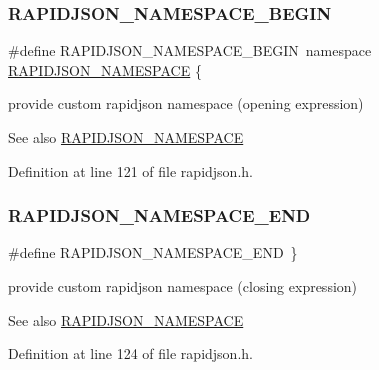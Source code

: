 \subsubsection{\texorpdfstring{RAPIDJSON\_NAMESPACE\_BEGIN}{RAPIDJSON\_NAMESPACE\_BEGIN}}
{\footnotesize\ttfamily \#define R\+A\+P\+I\+D\+J\+S\+O\+N\+\_\+\+N\+A\+M\+E\+S\+P\+A\+C\+E\+\_\+\+B\+E\+G\+IN~namespace \mbox{\hyperlink{group___r_a_p_i_d_j_s_o_n___c_o_n_f_i_g_ga743a79d3af927391fe3eb5c979136899}{R\+A\+P\+I\+D\+J\+S\+O\+N\+\_\+\+N\+A\+M\+E\+S\+P\+A\+CE}} \{}



provide custom rapidjson namespace (opening expression) 

\begin{DoxySeeAlso}{See also}
\mbox{\hyperlink{group___r_a_p_i_d_j_s_o_n___c_o_n_f_i_g_ga743a79d3af927391fe3eb5c979136899}{R\+A\+P\+I\+D\+J\+S\+O\+N\+\_\+\+N\+A\+M\+E\+S\+P\+A\+CE}} 
\end{DoxySeeAlso}


Definition at line 121 of file rapidjson.\+h.

\mbox{\label{group___r_a_p_i_d_j_s_o_n___c_o_n_f_i_g_gaf18f052a98b9f5df5448d39484b743c1}} 
\subsubsection{\texorpdfstring{RAPIDJSON\_NAMESPACE\_END}{RAPIDJSON\_NAMESPACE\_END}}
{\footnotesize\ttfamily \#define R\+A\+P\+I\+D\+J\+S\+O\+N\+\_\+\+N\+A\+M\+E\+S\+P\+A\+C\+E\+\_\+\+E\+ND~\}}



provide custom rapidjson namespace (closing expression) 

\begin{DoxySeeAlso}{See also}
\mbox{\hyperlink{group___r_a_p_i_d_j_s_o_n___c_o_n_f_i_g_ga743a79d3af927391fe3eb5c979136899}{R\+A\+P\+I\+D\+J\+S\+O\+N\+\_\+\+N\+A\+M\+E\+S\+P\+A\+CE}} 
\end{DoxySeeAlso}


Definition at line 124 of file rapidjson.\+h.

\mbox{\label{group___r_a_p_i_d_j_s_o_n___c_o_n_f_i_g_ga2b2a0d9143aa4fb31205a85b34c43952}} 
